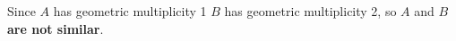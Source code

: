 \documentclass[a4paper,11pt,reqno]{amsart}
\numberwithin{equation}{section}
\begin{document}
\begin{enumerate}
\begin{center}
{{    Since \(A\) has geometric multiplicity 1 \(B\) has geometric multiplicity 2, so \(A\) and \(B\) \textbf{are not similar}.
    }}
    \end{center}
    
\end{enumerate}
\end{document}
